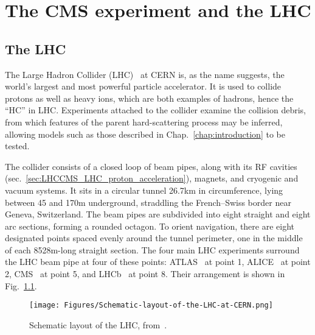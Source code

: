\chapter{The CMS experiment and the LHC} \label{chap:LHCCMS}
\section{The LHC} \label{sec:LHCCMS_LHC}
The Large Hadron Collider (LHC)~\cite{ref:1748-0221/3/08/S08001} at CERN is, as the name suggests, the world's largest
and most powerful particle accelerator. It is used to collide protons as well as heavy ions, which are both examples of hadrons, hence the ``HC'' in LHC.
Experiments attached to the collider examine the collision debris, from which features of the
parent hard-scattering process may be inferred, allowing models such as those described in Chap.~\ref{chap:introduction} to be tested.

The collider consists of a closed loop of beam pipes, along with its RF cavities (sec.~\ref{sec:LHCCMS_LHC_proton_acceleration}), magnets,
and cryogenic and vacuum systems. It sits in a circular tunnel 26.7\unit{km} in circumference, lying between 45 and 170\unit{m} underground, straddling
the French--Swiss border near Geneva, Switzerland. The beam pipes are subdivided into eight straight and eight arc sections, forming a rounded octagon.
To orient navigation, there are eight designated points spaced evenly around the tunnel perimeter, one in the middle of each 8528\unit{m}-long straight section.
The four main LHC experiments surround the LHC beam pipe at four of these points: ATLAS~\cite{ref:10.1088/1748-0221/3/08/S08003}
at point 1, ALICE~\cite{ref:1748-0221/3/08/S08002} at point 2, CMS~\cite{ref:1748-0221/3/08/S08004} at point 5, and LHCb~\cite{ref:1748-0221/3/08/S08005} at point 8.
Their arrangement is shown in Fig.~\ref{fig:LHC_schematic}.

\begin{figure}[hbtp]
  \begin{center}
    \texttt{[image: Figures/Schematic-layout-of-the-LHC-at-CERN.png]}
    \caption{
    Schematic layout of the LHC, from~\cite{ref:PhysRevAccelBeams.20.091002}.
    }
    \label{fig:LHC_schematic}
  \end{center}
\end{figure}

